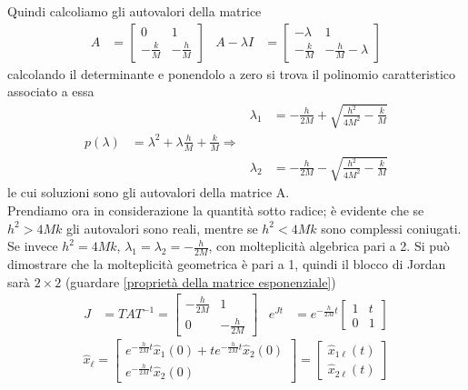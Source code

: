 \documentclass{article}
\begin{document}
Quindi calcoliamo gli autovalori della matrice
\begin{align*}
    A &= 
    \begin{bmatrix}
        0 & 1\\
        - \frac{k}{M} & -\frac{h}{M}
    \end{bmatrix}
    &
    A - \lambda I &= 
    \begin{bmatrix}
        -\lambda & 1\\
        - \frac{k}{M} & -\frac{h}{M} - \lambda
    \end{bmatrix}
\end{align*}
calcolando il determinante e ponendolo a zero si trova il polinomio caratteristico associato a essa
\begin{align*}
    & & \lambda_1 &= - \frac{h}{2M} + \sqrt{\frac{h^2}{4M^2} - \frac{k}{M}}\\
    p(\lambda) &= \lambda^2 + \lambda \frac{h}{M} + \frac{k}{M} \Longrightarrow\\
    & & \lambda_2 &= - \frac{h}{2M} - \sqrt{\frac{h^2}{4M^2} - \frac{k}{M}}
\end{align*}
le cui soluzioni sono gli autovalori della matrice A.\\
Prendiamo ora in considerazione la quantità sotto radice; è evidente che se $h^2 > 4Mk$ gli autovalori sono reali, mentre se $h^2 < 4Mk$ sono complessi coniugati.
\vspace*{0.2cm}\\
Se invece $h^2 = 4Mk$, $\lambda_1 = \lambda_2 = -\frac{h}{2M}$, con molteplicità algebrica pari a 2. Si può dimostrare che la molteplicità geometrica è pari a 1, quindi il blocco di Jordan sarà $2 \times 2$ (guardare \ref{proprietà della matrice esponenziale})
\begin{align*}
    J &= TAT^{-1} = 
    \begin{bmatrix}
        - \frac{h}{2M} & 1\\
        0 & - \frac{h}{2M}
    \end{bmatrix}
    &
    e^{Jt} &= e^{- \frac{h}{2M}t}
    \begin{bmatrix}
        1 & t\\
        0 & 1
    \end{bmatrix}
\end{align*}
\[
    \hat x_\ell = 
    \begin{bmatrix}
        e^{- \frac{h}{2M}t} \hat x_1(0) + t e^{- \frac{h}{2M}t} \hat x_2(0) \\
        e^{- \frac{h}{2M}t} \hat x_2(0)
    \end{bmatrix}
    =
    \begin{bmatrix}
        \hat x_{1 \ell}(t)\\
        \hat x_{2 \ell}(t)
    \end{bmatrix}
\]
\end{document}
